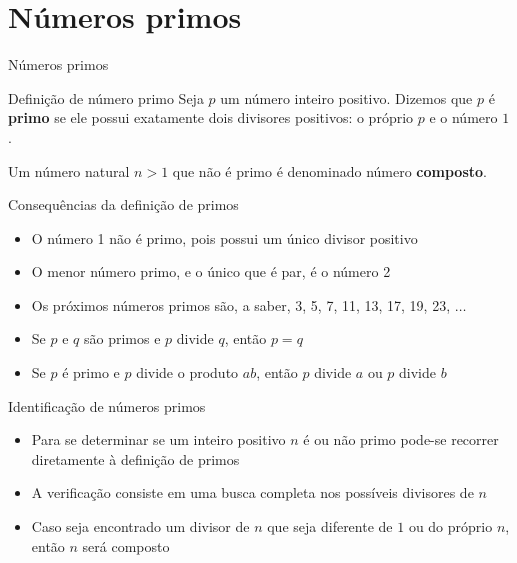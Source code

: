 \section{Números primos}

\begin{frame}[fragile]{Números primos}

    \begin{block}{Definição de número primo}
    Seja $p$ um número inteiro positivo. Dizemos que $p$ é \textbf{primo} se ele possui exatamente 
    dois divisores positivos: o próprio $p$ e o número $1$.

    Um número natural $n > 1$ que não é primo é denominado número \textbf{composto}. 
    \end{block}

\end{frame}


\begin{frame}[fragile]{Consequências da definição de primos}

    \begin{itemize}
        \item O número 1 não é primo, pois possui um único divisor positivo

        \item O menor número primo, e o único que é par, é o número 2

        \item Os próximos números primos são, a saber, 3, 5, 7, 11, 13, 17, 19, 23, $\ldots$

        \item Se $p$ e $q$ são primos e $p$ divide $q$, então $p = q$

        \item Se $p$ é primo e $p$ divide o produto $ab$, então $p$ divide $a$ ou $p$ divide $b$ 

    \end{itemize}

\end{frame}

\begin{frame}[fragile]{Identificação de números primos}

    \begin{itemize}
        \item Para se determinar se um inteiro positivo $n$ é ou não primo pode-se recorrer 
            diretamente à definição de primos 

        \item A verificação consiste em uma busca completa nos possíveis divisores de $n$

        \item Caso seja encontrado um divisor de $n$ que seja diferente de $1$ ou do próprio $n$, 
            então $n$ será composto
    \end{itemize}

\end{frame}

